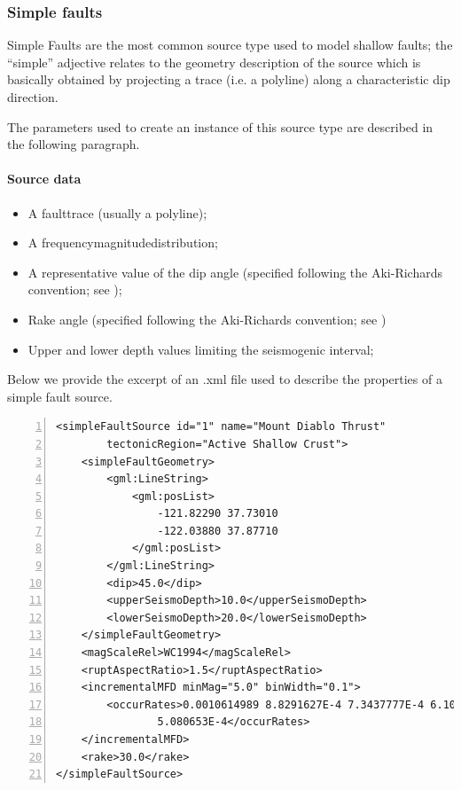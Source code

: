 \subsubsection{Simple faults}
%
Simple Faults are the most common source type used to model shallow 
faults; the ``simple'' adjective relates to the geometry description 
of the source which is basically obtained by projecting a trace 
(i.e. a polyline) along a characteristic dip direction. 

The parameters used to create an instance of this 
source type are described in the following paragraph.
%
\paragraph{Source data}
%
\begin{itemize}
\item A \gls{faulttrace} (usually a polyline); 
\item A \gls{frequencymagnitudedistribution};
\item A representative value of the dip angle (specified following 
the Aki-Richards convention; see \citet{aki2002});
\item Rake angle (specified following the Aki-Richards convention; 
see \citet{aki2002}) 
\item Upper and lower depth values limiting the seismogenic interval; 
\end{itemize}
Below we provide the excerpt of an .xml file used to describe the 
properties of a simple fault source.
\begin{Verbatim}[frame=single, commandchars=\\\{\}, fontsize=\footnotesize,
    numbers=left, numbersep=2pt]
<simpleFaultSource id="1" name="Mount Diablo Thrust" 
		tectonicRegion="Active Shallow Crust">
    <simpleFaultGeometry>
        <gml:LineString>
            <gml:posList>
                -121.82290 37.73010
                -122.03880 37.87710
            </gml:posList>
        </gml:LineString>
        <dip>45.0</dip>
        <upperSeismoDepth>10.0</upperSeismoDepth>
        <lowerSeismoDepth>20.0</lowerSeismoDepth>
    </simpleFaultGeometry>
    <magScaleRel>WC1994</magScaleRel>
    <ruptAspectRatio>1.5</ruptAspectRatio>
    <incrementalMFD minMag="5.0" binWidth="0.1">
        <occurRates>0.0010614989 8.8291627E-4 7.3437777E-4 6.108288E-4 
				5.080653E-4</occurRates>
    </incrementalMFD>
    <rake>30.0</rake>
</simpleFaultSource>
\end{Verbatim}
%
